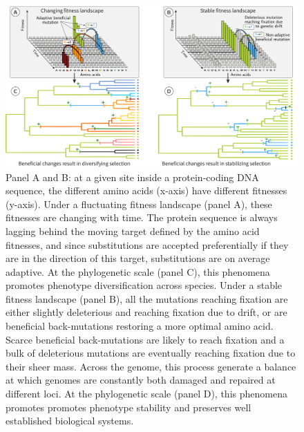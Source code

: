 \documentclass{article}
\begin{document}
    \begin{figure}[!ht]
        \centering
        \includegraphics[width=\textwidth, page=1] {artworks/figure.fitness-landscape}
        \caption{
            Panel A and B: at a given site inside a protein-coding DNA sequence, the different amino acids (x-axis) have different fitnesses (y-axis).
            Under a fluctuating fitness landscape (panel A), these fitnesses are changing with time.
            The protein sequence is always lagging behind the moving target defined by the amino acid fitnesses, and since substitutions are accepted preferentially if they are in the direction of this target, substitutions are on average adaptive.
            At the phylogenetic scale (panel C), this phenomena promotes phenotype diversification across species.
            Under a stable fitness landscape (panel B), all the mutations reaching fixation are either slightly deleterious and reaching fixation due to drift, or are beneficial back-mutations restoring a more optimal amino acid.
            Scarce beneficial back-mutations are likely to reach fixation and a bulk of deleterious mutations are eventually reaching fixation due to their sheer mass.
            Across the genome, this process generate a balance at which genomes are constantly both damaged and repaired at different loci.
            At the phylogenetic scale (panel D), this phenomena promotes promotes phenotype stability and preserves well established biological systems.
        }
        \label{fig:fitness-landscape}
    \end{figure}
\end{document}
